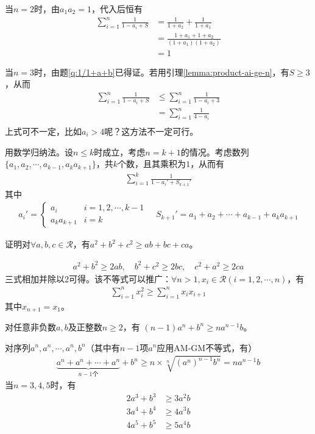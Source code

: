 当$n=2$时，由$a_1a_2=1$，代入后恒有
\begin{align*}
  \sum_{i=1}^n \frac{1}{1 - a_i + S} &= \frac{1}{1+a_2} + \frac1{1+a_1}\\
                                     &= \frac{1+a_1 + 1 + a_2}{(1+a_1)(1+a_2)}\\
                                     &=1
\end{align*}

当$n=3$时，由题\ref{q:1/1+a+b}已得证。若用引理\ref{lemma:product-ai-ge-n}，有$S\ge 3$，从而
\begin{align*}
  \sum_{i=1}^n \frac{1}{1 - a_i + S} &\le \sum_{i=1}^n \frac{1}{1 - a_i + 3}\\
                                     &=   \sum_{i=1}^n \frac{1}{4 - a_i}\\
\end{align*}
{\color{red}上式可不一定，比如$a_i>4$呢？这方法不一定可行。}

用数学归纳法。设$n\le k$时成立，考虑$n=k+1$的情况。考虑数列$\{a_1,a_2,\cdots, a_{k-1}, a_ka_{k+1}\}$，共$k$个数，且其乘积为$1$，从而有
\begin{align*}
  \sum_{i=1}^{k} \frac{1}{1 - a_i' + S_{k+1}'}
\end{align*}
其中
\begin{align*}
  a_i'=
  \begin{cases}
    a_i &i=1,2,\cdots,k-1\\
    a_ka_{k+1} &i=k
  \end{cases} \quad
  S_{k+1}'= a_1+a_2+\cdots +a_{k-1} + a_ka_{k+1}
\end{align*}

\begin{example}
  证明对$\forall a,b,c\in\mathcal{R}$，有$a^2+b^2+c^2\ge ab+bc+ca$。
\end{example}

\begin{align*}
  a^2+b^2\ge 2ab,\quad b^2+c^2\ge 2bc,\quad c^2+a^2\ge 2ca
\end{align*}
三式相加并除以2可得。该不等式可以推广：$\forall n>1, x_i\in\mathcal{R}(i=1,2,\cdots,n)$，有
\begin{align*}
  \sum_{i=1}^n x_i^2\ge \sum_{i=1}^n x_ix_{i+1}
\end{align*}
其中$x_{n+1}=x_1$。



\begin{example}
  对任意非负数$a,b$及正整数$n\ge2$，有 $(n-1)a^n + b^n\ge na^{n-1}b$。
\end{example}
对序列$a^n,a^n,\cdots,a^n,b^n$（其中有$n-1$项$a^n$应用AM-GM不等式，有）
\begin{align*}
  \underbrace{a^n + a^n + \cdots + a^n}_{n-1\text{个}} + b^n \ge
  n\times \sqrt[n]{\left(a^n\right)^{n-1} b^n}
  = na^{n-1}b
\end{align*}
当$n=3,4,5$时，有
\begin{align*}
  2a^3 + b^3&\ge 3a^2b\\
  3a^4 + b^4&\ge 4a^3b\\
  4a^5 + b^5&\ge 5a^4b
\end{align*}

